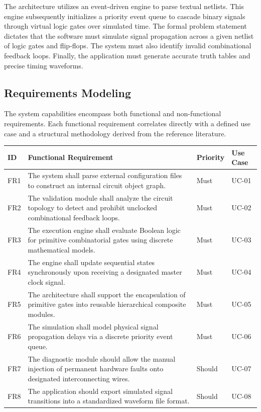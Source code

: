 \documentclass[12pt, a4paper]{article}
\begin{document}
The architecture utilizes an event-driven engine to parse textual netlists. This engine subsequently initializes a priority event queue to cascade binary signals through virtual logic gates over simulated time. The formal problem statement dictates that the software must simulate signal propagation across a given netlist of logic gates and flip-flops. The system must also identify invalid combinational feedback loops. Finally, the application must generate accurate truth tables and precise timing waveforms.

\subsection{Requirements Modeling}
The system capabilities encompass both functional and non-functional requirements. Each functional requirement correlates directly with a defined use case and a structural methodology derived from the reference literature. 

\begin{table}[h!]
\centering
\renewcommand{\arraystretch}{1.3}
\begin{tabularx}{\textwidth}{|l|X|l|l|}
\hline
\textbf{ID} & \textbf{Functional Requirement} & \textbf{Priority} & \textbf{Use Case} \\ \hline
FR1 & The system shall parse external configuration files to construct an internal circuit object graph. & Must & UC-01 \\ \hline
FR2 & The validation module shall analyze the circuit topology to detect and prohibit unclocked combinational feedback loops. & Must & UC-02 \\ \hline
FR3 & The execution engine shall evaluate Boolean logic for primitive combinatorial gates using discrete mathematical models. & Must & UC-03 \\ \hline
FR4 & The engine shall update sequential states synchronously upon receiving a designated master clock signal. & Must & UC-04 \\ \hline
FR5 & The architecture shall support the encapsulation of primitive gates into reusable hierarchical composite modules. & Must & UC-05 \\ \hline
FR6 & The simulation shall model physical signal propagation delays via a discrete priority event queue. & Must & UC-06 \\ \hline
FR7 & The diagnostic module should allow the manual injection of permanent hardware faults onto designated interconnecting wires. & Should & UC-07 \\ \hline
FR8 & The application should export simulated signal transitions into a standardized waveform file format. & Should & UC-08 \\ \hline
\end{tabularx}
\end{table}
\end{document}
